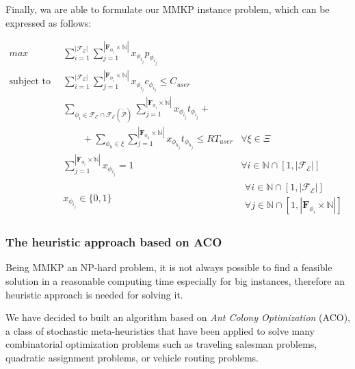 \documentclass[12pt,a4paper]{report}
\newcommand*{\N}{\mathbb{N}}
\theoremstyle{definition}
\begin{document}
Finally, wa are able to formulate our MMKP instance problem, which can be expressed as follows:

\begin{align}
	\label{MMKP}
	\displaystyle max \quad & \displaystyle \sum_{i = 1}^{|\mathscr{F_E}|}  \sum_{j = 1}^{|\textbf{F}_{\phi_{i}} \times \N|} x_{\phi_{i_{j}}} p_{\phi_{i_{j}}} & \\	
	\text{subject to} \quad  & \displaystyle \sum_{i = 1}^{|\mathscr{F_E}|}  \sum_{j = 1}^{|\textbf{F}_{\phi_{i}} \times \N|} x_{\phi_{i_{j}}} c_{\phi_{i_{j}}} \leq C_{user} & \\
	& \displaystyle \sum_{\phi_i \in \mathscr{F_E} \cap \mathscr{F_E}(\mathcal{\widetilde{P}})}  \sum_{j = 1}^{|\textbf{F}_{\phi_{i}} \times \N|} x_{\phi_{i_{j}}} t_{\phi_{i_{j}}} + \nonumber \\
	& \qquad + \sum_{\phi_h \in \xi}  \sum_{j = 1}^{|\textbf{F}_{\phi_{h}} \times \N|} x_{\phi_{h_{j}}} t_{\phi_{h_{j}}} \leq RT_{user} & 
	\forall \xi \in \Xi \\	
	& \displaystyle \sum_{j = 1}^{|\textbf{F}_{\phi_{i}} \times \N|} x_{\phi_{i_{j}}} = 1 & \forall i \in \N \cap \left[ 1, |\mathscr{F_E}| \right] \\
	& x_{\phi_{i_{j}}} \in \lbrace 0, 1 \rbrace &
	\begin{array}{r}
		\forall i \in \N \cap \left[ 1, |\mathscr{F_E}| \right] \\ \forall j \in \N \cap [1,|\textbf{F}_{\phi_{i}} \times \N|]
	\end{array}
\end{align}










\subsubsection{The heuristic approach based on ACO}

Being MMKP an NP-hard problem, it is not always possible to find a feasible solution in a reasonable computing time especially for big instances, therefore an heuristic approach is needed for solving it. 

We have decided to built an algorithm based on \textit{Ant Colony Optimization} (ACO), a class of stochastic meta-heuristics that have been applied to solve many combinatorial optimization problems such as traveling salesman problems, quadratic assignment problems, or vehicle routing problems. 
\end{document}
